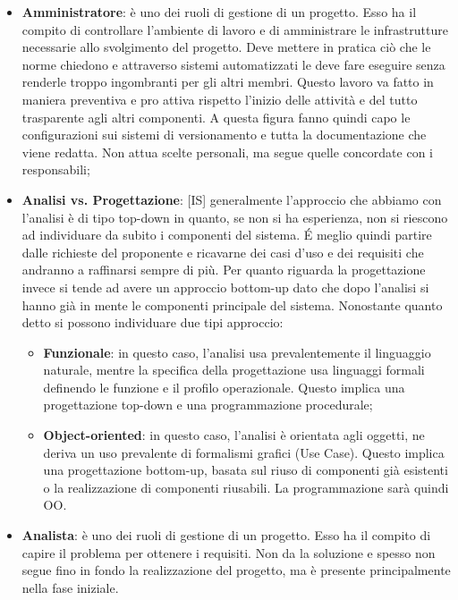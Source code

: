 \begin{itemize}
	\item \textbf{Amministratore}: è uno dei ruoli di gestione di un progetto. Esso ha il compito di controllare l'ambiente di lavoro e di amministrare le infrastrutture necessarie allo svolgimento del progetto. \newline
	Deve mettere in pratica ciò che le norme chiedono e attraverso sistemi automatizzati le deve fare eseguire senza renderle troppo ingombranti per gli altri membri. Questo lavoro va fatto in maniera preventiva e pro attiva rispetto l'inizio delle attività e del tutto trasparente agli altri componenti. \newline
	A questa figura fanno quindi capo le configurazioni sui sistemi di versionamento e tutta la documentazione che viene redatta. Non attua scelte personali, ma segue quelle concordate con i responsabili;
	\item \textbf{Analisi vs. Progettazione}: [IS] generalmente l'approccio che abbiamo con l'analisi è di tipo top-down in quanto, se non si ha esperienza, non si riescono ad individuare da subito i componenti del sistema. \'E meglio quindi partire dalle richieste del proponente e ricavarne dei casi d'uso e dei requisiti che andranno a raffinarsi sempre di più. \newline
	Per quanto riguarda la progettazione invece si tende ad avere un approccio bottom-up dato che dopo l'analisi si hanno già in mente le componenti principale del sistema. \newline
	Nonostante quanto detto si possono individuare due tipi approccio:
		\begin{itemize}
			\item \textbf{Funzionale}: in questo caso, l'analisi usa prevalentemente il linguaggio naturale, mentre la specifica della progettazione usa linguaggi formali definendo le funzione e il profilo operazionale. Questo implica una progettazione top-down e una programmazione procedurale;
			\item \textbf{Object-oriented}: in questo caso, l'analisi è orientata agli oggetti, ne deriva un uso prevalente di formalismi grafici (Use Case). Questo implica una progettazione bottom-up, basata sul riuso di componenti già esistenti o la realizzazione di componenti riusabili. La programmazione sarà quindi OO.
		\end{itemize}
	\item \textbf{Analista}: è uno dei ruoli di gestione di un progetto. Esso ha il compito di capire il problema per ottenere i requisiti. Non da la soluzione e spesso non segue fino in fondo la realizzazione del progetto, ma è presente principalmente nella fase iniziale. \newline

\end{itemize}
